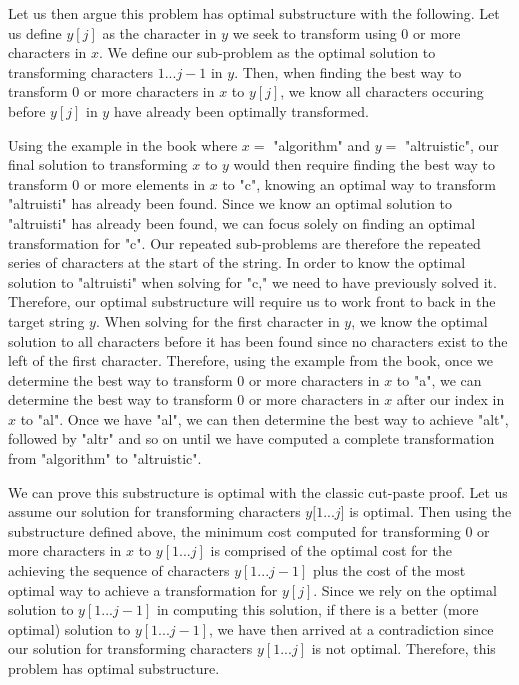 \documentclass[11pt]{article}
\begin{document}
Let us then argue this problem has optimal substructure with the following. Let us define $y[j]$ as the character in $y$ we seek to transform using 0 or more characters in $x$. We define our sub-problem as the optimal solution to transforming characters $1...j-1$ in $y$. Then, when finding the best way to transform 0 or more characters in $x$ to $y[j]$, we know all characters occuring before $y[j]$ in $y$ have already been optimally transformed.

Using the example in the book where $x =$ "algorithm" and $y =$ "altruistic", our final solution to transforming $x$ to $y$ would then require finding the best way to transform 0 or more elements in $x$ to "c", knowing an optimal way to transform "altruisti" has already been found. Since we know an optimal solution to "altruisti" has already been found, we can focus solely on finding an optimal transformation for "c". Our repeated sub-problems are therefore the repeated series of characters at the start of the string. In order to know the optimal solution to "altruisti" when solving for "c," we need to have previously solved it. Therefore, our optimal substructure will require us to work front to back in the target string $y$. When solving for the first character in $y$, we know the optimal solution to all characters before it has been found since no characters exist to the left of the first character. Therefore, using the example from the book, once we determine the best way to transform 0 or more characters in $x$ to "a", we can determine the best way to transform 0 or more characters in $x$ after our index in $x$ to "al". Once we have "al", we can then determine the best way to achieve "alt", followed by "altr" and so on until we have computed a complete transformation from "algorithm" to "altruistic".

We can prove this substructure is optimal with the classic cut-paste proof. Let us assume our solution for transforming characters $y[1...j$] is optimal. Then using the substructure defined above, the minimum cost computed for transforming 0 or more characters in $x$ to $y[1...j]$ is comprised of the optimal cost for the achieving the sequence of characters $y[1...j-1]$ plus the cost of the most optimal way to achieve a transformation for $y[j]$. Since we rely on the optimal solution to $y[1...j-1]$ in computing this solution, if there is a better (more optimal) solution to $y[1...j-1]$, we have then arrived at a contradiction since our solution for transforming characters $y[1...j]$ is not optimal. Therefore, this problem has optimal substructure.
\end{document}
